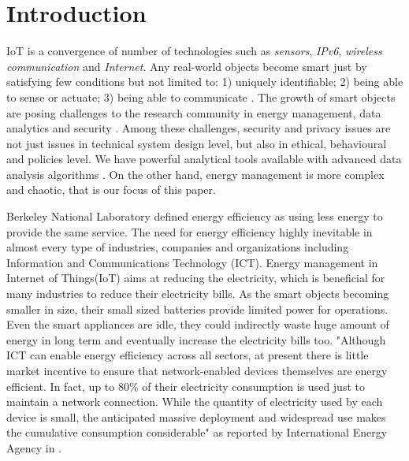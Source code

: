 \chapter{Introduction}
IoT is a convergence of number of technologies such as \textit{sensors}, \textit{IPv6}, \textit{wireless communication} and  \textit{Internet}. Any real-world objects become smart just by satisfying few conditions but not limited to: 1) uniquely identifiable;  2) being able to sense or actuate; 3) being able to communicate \cite{IoT:Defn}. The growth of smart objects are posing challenges to the research community in energy management, data analytics and security \cite{IoT:Challenge}. Among these challenges, security and privacy issues are not just issues in technical system design level, but also in ethical, behavioural and policies level. We have powerful analytical tools available with advanced data analysis algorithms \cite{BigD:Deep}. On the other hand, energy management is more complex and chaotic, that is our focus of this paper. 

Berkeley National Laboratory defined energy efficiency as using less energy to provide the same service. The need for energy efficiency highly inevitable in almost every type of industries, companies and organizations including Information and Communications Technology (ICT). Energy management in Internet of Things(IoT) aims at reducing the electricity, which is beneficial for many industries to reduce their electricity bills. As the smart objects becoming smaller in size, their small sized batteries provide limited power for operations. Even the smart appliances are idle, they could indirectly waste huge amount of energy in long term and eventually increase the electricity bills too. "Although ICT can enable energy efficiency across all sectors, at present there is little market incentive to ensure that network-enabled devices themselves are energy efficient. In fact, up to 80\% of their electricity consumption is used just to maintain a network connection. While the quantity of electricity used by each device is small, the anticipated massive deployment and widespread use makes the cumulative consumption considerable" as reported by International Energy Agency in \cite{IEA:bdle}.

